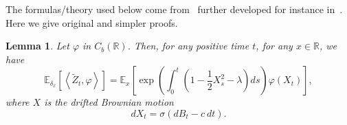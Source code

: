 \documentclass[10pt]{amsart}
\newtheorem{lemm}[theo]{Lemma}\newtheorem{prop}[theo]{Proposition}\newtheorem{coro}[theo]{Corollary}\newtheorem{conj}[theo]{Conjecture}
\theoremstyle{definition}\newtheorem{defi}[theo]{Definition}\newtheorem{rema}[theo]{Remark}\newtheorem{exam}[theo]{Example}\newtheorem{exem}[theo]{Example}\newtheorem{nota}[theo]{Notation}
\newcommand*\R{\mathbb{R}}
\newcommand*\E{\mathbb{E}}
\begin{document}
The formulas/theory used below come from~\cite{kurtz1997conceptual,lyons1995conceptual} further developed for instance in~\cite{bansaye_limit_2011,cloez,hardyharris3,Marguet2}. Here we give original and simpler proofs.


\begin{lemm}\label{lem:MTO}
Let $\varphi$ in $C_{b}(\R)$. Then, for any positive time $t$, for any $x\in \R$, we have
\begin{equation}\label{eq:MTO}
\E_{\delta_{x}}\left[\left\langle \widetilde{Z}_{t}, \varphi\right\rangle \right]=\E_{x}\left[\exp\left(\int_{0}^{t} \left(1-\frac{1}{2}X_{s}^{2}-\lambda \right)ds \right)\varphi(X_{t}) \right],
\end{equation}
where $X$ is the drifted Brownian motion
\begin{equation}\label{def:Y}
dX_{t}= \sigma\left(dB_{t}-c\ dt\right).
\end{equation}
\end{lemm}
\end{document}
